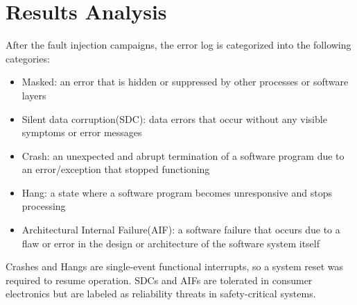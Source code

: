 \documentclass[conference]{IEEEtran}
\begin{document}
\section{Results Analysis}
After the fault injection campaigns, the error log is categorized into the following categories:
\begin{itemize}
    \item Masked: an error that is hidden or suppressed by other processes or software layers 
    \item Silent data corruption(SDC): data errors that occur without any visible symptoms or error messages
    \item Crash: an unexpected and abrupt termination of a software program due to an error/exception that stopped functioning
    \item Hang: a state where a software program becomes unresponsive and stops processing 
    \item Architectural Internal Failure(AIF): a software failure that occurs due to a flaw or error in the design or architecture of the software system itself
\end{itemize}
Crashes and Hangs are single-event functional interrupts, so a system reset was required to resume operation. SDCs and AIFs are tolerated in 
consumer electronics but are labeled as reliability threats in safety-critical systems. 
\end{document}
